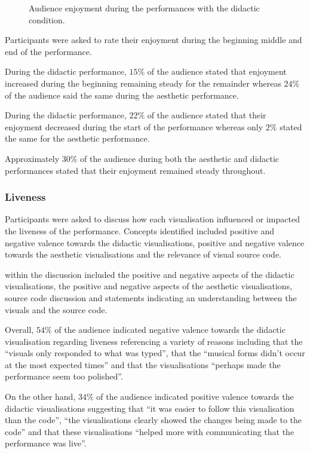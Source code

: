 \documentclass{sig-alternate}
\begin{document}
\begin{figure}
\centering
{}
\caption{Audience enjoyment during the performances with the didactic condition.}
\end{figure}

Participants were asked to rate their enjoyment during the beginning middle and end of the performance.

During the didactic performance, $15\%$ of the audience stated that enjoyment increased during the beginning remaining steady for the remainder whereas $24\%$ of the audience said the same during the aesthetic performance.

During the didactic performance, $22\%$ of the audience stated that their enjoyment decreased during the start of the performance whereas only $2\%$ stated the same for the aesthetic performance.

Approximately $30\%$ of the audience during both the aesthetic and didactic performances stated that their enjoyment remained steady throughout.

\subsubsection{Liveness}

Participants were asked to discuss how each visualisation influenced or impacted the liveness of the performance. Concepts identified included positive and negative valence towards the didactic visualisations, positive and negative valence towards the aesthetic visualisations and the relevance of visual source code. 

within the discussion included the positive and negative aspects of the didactic visualisations, the positive and negative aspects of the aesthetic visualisations, source code discussion and statements indicating an understanding between the visuals and the source code.

Overall, $54\%$ of the audience indicated negative valence towards the didactic visualisation regarding liveness referencing a variety of reasons including that the ``visuals only responded to what was typed'', that the ``musical forms didn't occur at the most expected times'' and that the visualisations ``perhaps made the performance seem too polished''.

On the other hand, $34\%$ of the audience indicated positive valence towards the didactic visualisations suggesting that ``it was easier to follow this visualisation than the code'', ``the visualisations clearly showed the changes being made to the code'' and that these visualisations ``helped more with communicating that the performance was live''.
\end{document}
